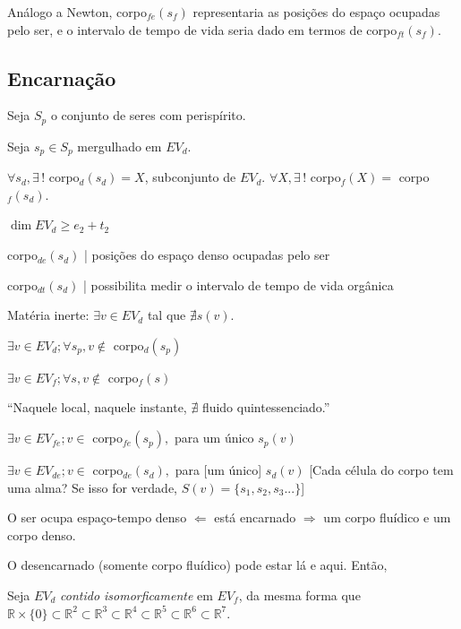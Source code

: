 \documentclass[12pt,a4paper]{article}
\begin{document}
			An\'alogo a Newton, corpo$_{fe}(s_f)$ representaria as posi\c{c}\~oes do espa\c{c}o ocupadas pelo ser, e o intervalo de tempo de vida seria dado em termos de corpo$_{ft}(s_f)$.

			\subsection{Encarna\c{c}\~ao}

			\begin{flushright}
			\end{flushright}

			Seja $S_p$ o conjunto de seres com perisp\'irito.

			Seja $s_p \in S_p$ mergulhado em $EV_d$.

			$\forall s_d, \exists\,!$ corpo$_d(s_d) = X$, subconjunto de $EV_d$. $\forall X, \exists\,!$ corpo$_f(X) =$ corpo$_f(s_d)$.

			$\dim EV_d \ge e_2 + t_2$

			corpo$_{de}(s_d)$ | posi\c{c}\~oes do espa\c{c}o denso ocupadas pelo ser

			corpo$_{dt}(s_d)$ | possibilita medir o intervalo de tempo de vida org\^anica

			Mat\'eria inerte: $\exists v \in EV_d$ tal que $\nexists s(v)$.

			$\exists v \in EV_d ; \forall s_p, v \notin$ corpo$_d(s_p)$

			$\exists v \in EV_f ; \forall s, v \notin$ corpo$_f(s)$

			\textquotedblleft Naquele local, naquele instante, $\nexists$ fluido quintessenciado.\textquotedblright

			$\exists v \in EV_{fe} ; v \in$ corpo$_{fe}(s_p),$ para um \'unico $s_p(v)$

			$\exists v \in EV_{de} ; v \in$ corpo$_{de}(s_d),$ para [um \'unico] $s_d(v)$ [Cada c\'elula do corpo tem uma alma? Se isso for verdade, $S(v) = \{s_1, s_2, s_3...\}$]

			O ser ocupa espa\c{c}o-tempo denso $\Leftarrow$ est\'a encarnado $\Rightarrow$ um corpo flu\'idico e um corpo denso.

			O desencarnado (somente corpo flu\'idico) pode estar l\'a e aqui. Ent\~ao,

			Seja $EV_d$ \emph{contido isomorficamente} em $EV_f$, da mesma forma que $\mathbb{R} \times \{0\} \subset \mathbb{R}^2 \subset \mathbb{R}^3 \subset \mathbb{R}^4 \subset \mathbb{R}^5 \subset \mathbb{R}^6 \subset \mathbb{R}^7$.
\end{document}
